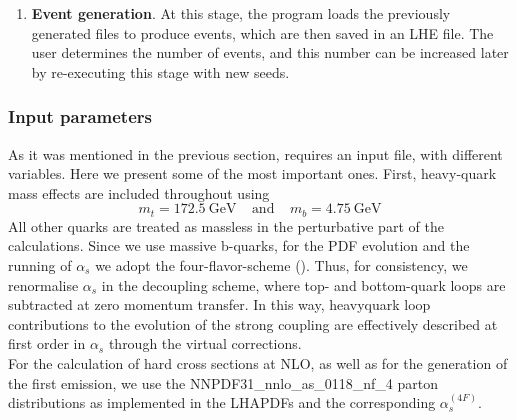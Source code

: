 \begin{enumerate}
    \item \textbf{Event generation}. At this stage, the program loads the previously generated files to produce events, which are then saved in an LHE file. The user determines the number of events, and this number can be increased later by re-executing this stage with new seeds.
\end{enumerate}

\subsubsection{Input parameters}
\noindent As it was mentioned in the previous section, {\selectfont{Powheg Box Res}} requires an input file, with different variables. Here we present some of the most important ones. First, heavy-quark mass effects are included throughout using 
 \begin{equation}
     m_t = 172.5 \: \text{GeV} \:\:\:\:\: \text{and} \:\:\:\:\:  m_b = 4.75 \: \text{GeV}
 \end{equation}
All other quarks are treated as massless in the perturbative part of the calculations. Since we use massive b-quarks, for the PDF evolution and the running of $\alpha_s$ we adopt the four-flavor-scheme ({\selectfont{4fs}}). Thus, for consistency, we renormalise $\alpha_s$ in the decoupling scheme, where top- and bottom-quark loops are subtracted at zero momentum transfer. In this way, heavyquark loop contributions to the evolution of the strong coupling are effectively described at first order in $\alpha_s$ through the virtual corrections. \\
\indent For the calculation of hard cross sections at NLO, as well as for the generation of the first {\selectfont{Powheg}} emission, we use the NNPDF31\_nnlo\_as\_0118\_nf\_4 parton distributions \cite{NNPDF} as implemented in the LHAPDFs \cite{LHAPDF} and the corresponding $\alpha_s^{(4F)}$.
 
